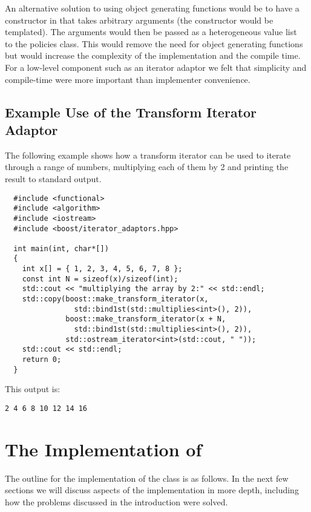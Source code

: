\documentclass{netobjectdays}
\begin{document}
An alternative solution to using object generating functions would be
to have a constructor in  that takes arbitrary
arguments (the constructor would be templated). The arguments would
then be passed as a heterogeneous value list~\cite{TMPW00:Eisenecker}
to the policies class. This would remove the need for object
generating functions but would increase the complexity of the
implementation and the compile time. For a low-level component such as
an iterator adaptor we felt that simplicity and compile-time were more
important than implementer convenience.

\subsection{Example Use of the Transform Iterator Adaptor}

The following example shows how a transform iterator can be used to
iterate through a range of numbers, multiplying each of them by 2 and
printing the result to standard output.

{\footnotesize
\begin{verbatim}
  #include <functional>
  #include <algorithm>
  #include <iostream>
  #include <boost/iterator_adaptors.hpp>

  int main(int, char*[])
  {
    int x[] = { 1, 2, 3, 4, 5, 6, 7, 8 };
    const int N = sizeof(x)/sizeof(int);
    std::cout << "multiplying the array by 2:" << std::endl;
    std::copy(boost::make_transform_iterator(x, 
                std::bind1st(std::multiplies<int>(), 2)),
              boost::make_transform_iterator(x + N, 
                std::bind1st(std::multiplies<int>(), 2)),
              std::ostream_iterator<int>(std::cout, " "));
    std::cout << std::endl;
    return 0;
  }
\end{verbatim}
}

\noindent This output is: 
{\footnotesize
\begin{verbatim}
2 4 6 8 10 12 14 16
\end{verbatim}
}


\section{The Implementation of }

The outline for the implementation of the 
class is as follows. In the next few sections we will discuss aspects
of the implementation in more depth, including how the problems
discussed in the introduction were solved.
\end{document}
